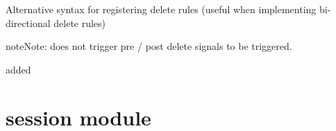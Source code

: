 \documentclass[letterpaper,10pt,english]{sphinxmanual}
\begin{document}
\begin{fulllineitems}
\begin{fulllineitems}
Alternative syntax for registering delete rules (useful when implementing
bi-directional delete rules)

\begin{sphinxVerbatim}[commandchars=\\\{\}]
 
      
      

  
\end{sphinxVerbatim}

\begin{sphinxadmonition}{note}{Note:}
 does not trigger pre / post delete signals to be
triggered.
\end{sphinxadmonition}

added 

\end{fulllineitems}


\end{fulllineitems}



\chapter{session module}
\label{\detokenize{session:session-module}}\label{\detokenize{session::doc}}\label{\detokenize{session:module-session}}
\end{document}
